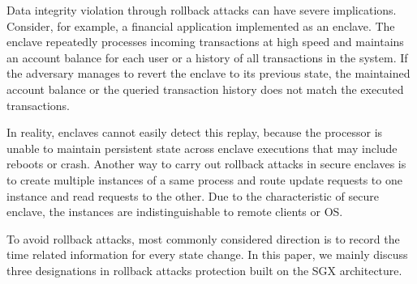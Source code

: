 Data integrity violation through rollback attacks can have severe implications. Consider, for example, a financial application implemented as an enclave. The enclave repeatedly processes incoming transactions at high speed and maintains an account balance for each user or a history of all transactions in the system. If the adversary manages to revert the enclave to its previous state, the maintained account balance or the queried transaction history does not match the executed transactions.

In reality, enclaves cannot easily detect this replay, because the processor is unable to maintain persistent state across enclave executions that may include reboots or crash. Another way to carry out rollback attacks in secure enclaves is to create multiple instances of a same process and route update requests to one instance and read requests to the other. Due to the characteristic of secure enclave, the instances are indistinguishable to remote clients or OS.

To avoid rollback attacks, most commonly considered direction is to record the time related information for every state change. In this paper, we mainly discuss three designations in rollback attacks protection built on the SGX architecture.

